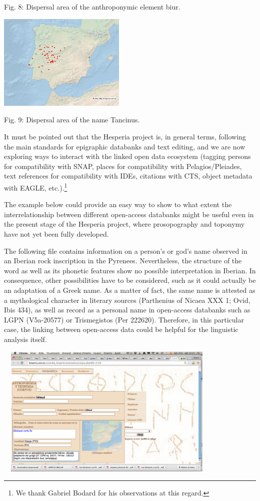 \documentclass[amsthm,ebook]{saparticle}
\begin{document}
Fig. 8: Dispersal area of the anthroponymic element biur.

 \includegraphics[width=6.092cm,height=4.583cm]{EpigraphyandonomasticsinHesperiadatabanktemplate-img009.jpg} 

Fig. 9: Dispersal area of the name Tancinus.

It must be pointed out that the Hesperia project is, in general terms, following the main standards for epigraphic
databanks and text editing, and we are now exploring ways to interact with the linked open data ecosystem (tagging
persons for compatibility with SNAP, places for compatibility with Pelagios/Pleiades, text references for compatibility
with IDEs, citations with CTS, object metadata with EAGLE, etc.).\footnote{ We thank Gabriel Bodard for his
observations at this regard.} 

The example below could provide an easy way to show to what extent the interrelationship between different open-access
databanks might be useful even in the present stage of the Hesperia project, where prosopography and toponymy have not
yet been fully developed. 

The following file contains information on a person’s or god’s name observed in an Iberian rock inscription in the
Pyrenees. Nevertheless, the structure of the word as well as its phonetic features show no possible interpretation in
Iberian. In consequence, other possibilities have to be considered, such as it could actually be an adaptation of a
Greek name. As a matter of fact, the same name is attested as a mythological character in literary sources (Parthenius
of Nicaea XXX 1; Ovid, Ibis 434), as well as record as a personal name in open-access databanks such as LGPN
(V5a-20577) or Trismegistos (Per 222620). Therefore, in this particular case, the linking between open-access data
could be helpful for the linguistic analysis itself.

 \includegraphics[width=10.862cm,height=6.325cm]{EpigraphyandonomasticsinHesperiadatabanktemplate-img010.png} 
\end{document}
